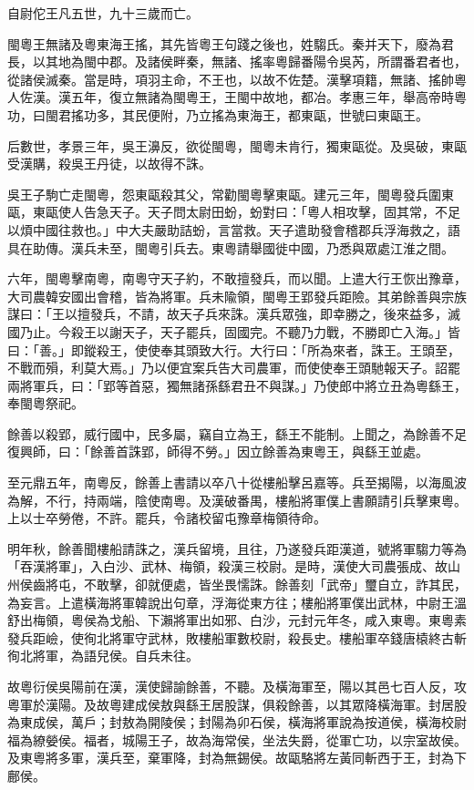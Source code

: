 \begin{pinyinscope}
自尉佗王凡五世，九十三歲而亡。

閩粵王無諸及粵東海王搖，其先皆粵王句踐之後也，姓騶氏。秦并天下，廢為君長，以其地為閩中郡。及諸侯畔秦，無諸、搖率粵歸番陽令吳芮，所謂番君者也，從諸侯滅秦。當是時，項羽主命，不王也，以故不佐楚。漢擊項籍，無諸、搖帥粵人佐漢。漢五年，復立無諸為閩粵王，王閩中故地，都冶。孝惠三年，舉高帝時粵功，曰閩君搖功多，其民便附，乃立搖為東海王，都東甌，世號曰東甌王。

后數世，孝景三年，吳王濞反，欲從閩粵，閩粵未肯行，獨東甌從。及吳破，東甌受漢購，殺吳王丹徒，以故得不誅。

吳王子駒亡走閩粵，怨東甌殺其父，常勸閩粵擊東甌。建元三年，閩粵發兵圍東甌，東甌使人告急天子。天子問太尉田蚡，蚡對曰：「粵人相攻擊，固其常，不足以煩中國往救也。」中大夫嚴助詰蚡，言當救。天子遣助發會稽郡兵浮海救之，語具在助傳。漢兵未至，閩粵引兵去。東粵請舉國徙中國，乃悉與眾處江淮之間。

六年，閩粵擊南粵，南粵守天子約，不敢擅發兵，而以聞。上遣大行王恢出豫章，大司農韓安國出會稽，皆為將軍。兵未隃領，閩粵王郢發兵距險。其弟餘善與宗族謀曰：「王以擅發兵，不請，故天子兵來誅。漢兵眾強，即幸勝之，後來益多，滅國乃止。今殺王以謝天子，天子罷兵，固國完。不聽乃力戰，不勝即亡入海。」皆曰：「善。」即鏦殺王，使使奉其頭致大行。大行曰：「所為來者，誅王。王頭至，不戰而殞，利莫大焉。」乃以便宜案兵告大司農軍，而使使奉王頭馳報天子。詔罷兩將軍兵，曰：「郢等首惡，獨無諸孫繇君丑不與謀。」乃使郎中將立丑為粵繇王，奉閩粵祭祀。

餘善以殺郢，威行國中，民多屬，竊自立為王，繇王不能制。上聞之，為餘善不足復興師，曰：「餘善首誅郢，師得不勞。」因立餘善為東粵王，與繇王並處。

至元鼎五年，南粵反，餘善上書請以卒八十從樓船擊呂嘉等。兵至揭陽，以海風波為解，不行，持兩端，陰使南粵。及漢破番禺，樓船將軍僕上書願請引兵擊東粵。上以士卒勞倦，不許。罷兵，令諸校留屯豫章梅領待命。

明年秋，餘善聞樓船請誅之，漢兵留境，且往，乃遂發兵距漢道，號將軍騶力等為「吞漢將軍」，入白沙、武林、梅領，殺漢三校尉。是時，漢使大司農張成、故山州侯齒將屯，不敢擊，卻就便處，皆坐畏懦誅。餘善刻「武帝」璽自立，詐其民，為妄言。上遣橫海將軍韓說出句章，浮海從東方往；樓船將軍僕出武林，中尉王溫舒出梅領，粵侯為戈船、下瀨將軍出如邪、白沙，元封元年冬，咸入東粵。東粵素發兵距嶮，使徇北將軍守武林，敗樓船軍數校尉，殺長史。樓船軍卒錢唐榬終古斬徇北將軍，為語兒侯。自兵未往。

故粵衍侯吳陽前在漢，漢使歸諭餘善，不聽。及橫海軍至，陽以其邑七百人反，攻粵軍於漢陽。及故粵建成侯敖與繇王居股謀，俱殺餘善，以其眾降橫海軍。封居股為東成侯，萬戶；封敖為開陵侯；封陽為卯石侯，橫海將軍說為按道侯，橫海校尉福為繚嫈侯。福者，城陽王子，故為海常侯，坐法失爵，從軍亡功，以宗室故侯。及東粵將多軍，漢兵至，棄軍降，封為無錫侯。故甌駱將左黃同斬西于王，封為下鄜侯。


\end{pinyinscope}
